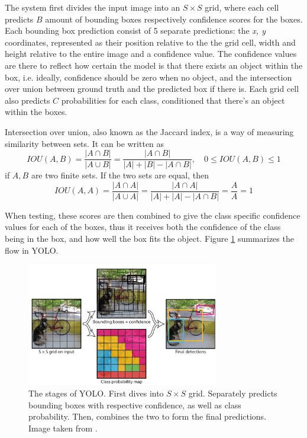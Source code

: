  The system first divides the input image into an  $S \times S$  grid, where each cell predicts $B$ amount of bounding boxes respectively confidence scores for the boxes. Each bounding box prediction consist of 5 separate predictions: the \textit{x, y} coordinates, represented as their position relative to the the grid cell, width and height relative to the entire image and a confidence value. The confidence values are there to reflect how certain the model is that there exists an object within the box, i.e. ideally, confidence should be zero when no object, and the intersection over union between ground truth and the predicted box if there is. Each grid cell also predicts $C$ probabilities for each class, conditioned that there's an object within the boxes. 
 
 Intersection over union, also known as the Jaccard index, is a way of measuring similarity between sets. It can be written as 
 \[
IOU(A,B) =  \frac{|A\cap B |}{|A\cup B|} =\frac{|A\cap B|}{|A| + |B| - |A \cap B|}
, \quad 0\leq IOU(A,B) \leq 1
 \]
 if $A,B$ are two finite sets. If the two sets are equal, then \[ IOU(A,A) =  \frac{|A\cap A |}{|A\cup A|} = \frac{|A\cap A|}{|A| + |A| - |A \cap B|}  = \frac{A}{A} = 1 \]
 
 When testing, these scores are then combined to give the class specific confidence values for each of the boxes, thus it receives both the confidence of the class being in the box, and how well the box fits the object. Figure \ref{fig:YOLO_stages} summarizes the flow in YOLO. 
\begin{figure}[hbtp]
\begin{center}
\includegraphics[width = 0.75\textwidth]{./Images/YOLO_stages.PNG} 
\caption{The stages of YOLO. First dives into $S \times S$ grid. Separately predicts bounding boxes with respective confidence, as well as class probability. Then, combines the two to form the final predictions. Image taken from \cite{YOLO1}.}
\label{fig:YOLO_stages}
\end{center}
\end{figure}

